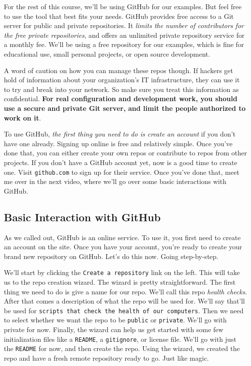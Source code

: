 	
	For the rest of this course, we'll be using GitHub for our examples. But feel free to use the tool that best fits your needs. GitHub provides free access to a Git server for public and private repositories. It \textit{limits the number of contributors for the free private repositories}, and offers an unlimited private repository service for a monthly fee. We'll be using a free repository for our examples, which is fine for educational use, small personal projects, or open source development.
	
	A word of caution on how you can manage these repos though. If hackers get hold of information about your organization's IT infrastructure, they can use it to try and break into your network. So make sure you treat this information as confidential. \textbf{For real configuration and development work, you should use a secure and private Git server, and limit the people authorized to work on it}.
	
	To use GitHub,\textit{ the first thing you need to do is create an account} if you don't have one already. Signing up online is free and relatively simple. Once you've done that, you can either create your own repos or contribute to repos from other projects. If you don't have a GitHub account yet, now is a good time to create one. Visit \verb|github.com| to sign up for their service. Once you've done that, meet me over in the next video, where we'll go over some basic interactions with GitHub.

	\subsection{Basic Interaction with GitHub} \label{W301c}

	As we called out, GitHub is an online service. To use it, you first need to create an account on the site. Once you have your account, you're ready to create your brand new repository on GitHub. Let's do this now. Going step-by-step.
	
	We'll start by clicking the \verb|Create a repository| link on the left. This will take us to the repo creation wizard. The wizard is pretty straightforward. The first thing we need to do is give a name for our repo. We'll call this repo \textit{health checks}. After that comes a description of what the repo will be used for. We'll say that'll be used for \texttt{scripts that check the health of our computers}. Then we need to select whether we want the repo to be \texttt{public} or \texttt{private}. We'll go with private for now. 
	Finally, the wizard can help us get started with some few initialization files like a \verb|README|, a \verb|gitignore|, or license file. We'll go with just the \verb|README| for now, and then create the repo. 
	Using the wizard, we created the repo and have a fresh remote repository ready to go. Just like magic. 
	
